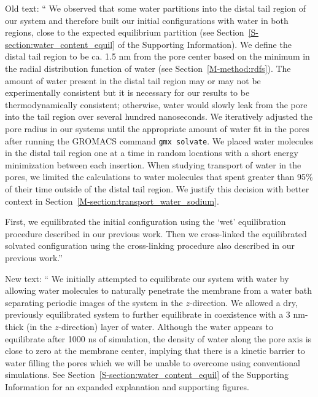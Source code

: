 \documentclass{article}
\begin{document}
\begin{enumerate}
    Old text: `` We observed that some water partitions into the distal tail region of our system and therefore
	built our initial configurations with water in both regions, close to the expected
	equilibrium partition (see Section~\ref{S-section:water_content_equil} of the Supporting
	Information). We define the distal tail region to be ca. 1.5 nm from the pore
	center based on the minimum in the radial distribution function of water
	(see Section~\ref{M-method:rdfs}). The amount of water present in the distal tail region
	may or may not be experimentally consistent but it is necessary for our results to be 
	thermodynamically consistent; otherwise, water would slowly leak from the pore into the
	tail region over several hundred nanoseconds. We iteratively adjusted the pore radius in our systems
	until the appropriate amount of water fit in the pores after running the GROMACS command
	\texttt{gmx solvate}. We placed water molecules in the distal tail region one at a time
	in random locations with a short energy minimization between each insertion. When 
	studying transport of water in the pores, we limited the calculations to water molecules
	that spent greater than 95\% of their time outside of the distal tail region. We 
	justify this decision with better context in Section~\ref{M-section:transport_water_sodium}.
	
    First, we equilibrated the initial configuration using the `wet' equilibration procedure 
	described in our previous work. Then we cross-linked the equilibrated solvated 
	configuration using the cross-linking procedure also described in our previous 
    work.''
           
    New text: `` We initially attempted to equilibrate our system with water by allowing water
	molecules to naturally penetrate the membrane from a water bath separating
	periodic images of the system in the $z$-direction. We allowed a dry, previously
	equilibrated system to further equilibrate in coexistence with a 3 nm-thick 
	(in the $z$-direction) layer of water. Although the water appears to equilibrate
	after 1000 ns of simulation, the density of water along the pore axis
	is close to zero at the membrane center, implying that there is a kinetic
	barrier to water filling the pores which we will be unable to overcome using
	conventional simulations. See Section~\ref{S-section:water_content_equil} 
    of the Supporting Information for an expanded explanation and supporting figures. 
	  

\end{enumerate}
\end{document}
